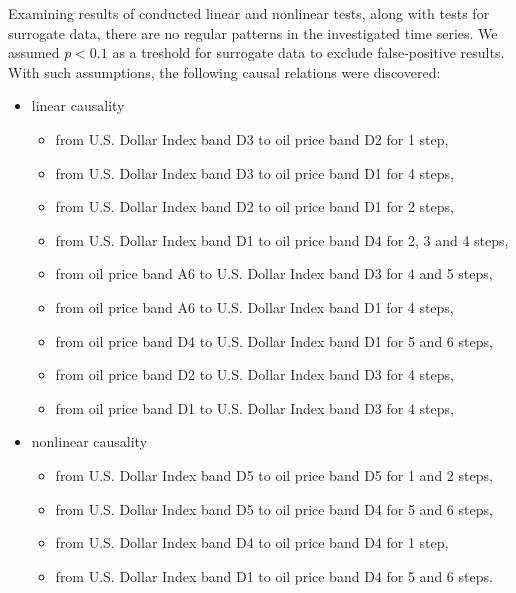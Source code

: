 Examining results of conducted linear and nonlinear tests, along with tests for surrogate data, there are no regular patterns in the investigated time series.
We assumed $p < 0.1$ as a treshold for surrogate data to exclude false-positive results.
With such assumptions, the following causal relations were discovered:
\begin{itemize}
    \item linear causality
    \begin{itemize}
        \item from U.S. Dollar Index band D3 to oil price band D2 for 1 step,
        \item from U.S. Dollar Index band D3 to oil price band D1 for 4 steps,
        \item from U.S. Dollar Index band D2 to oil price band D1 for 2 steps,
        \item from U.S. Dollar Index band D1 to oil price band D4 for 2, 3 and 4 steps,
        \item from oil price band A6 to U.S. Dollar Index band D3 for 4 and 5 steps,
        \item from oil price band A6 to U.S. Dollar Index band D1 for 4 steps,
        \item from oil price band D4 to U.S. Dollar Index band D1 for 5 and 6 steps,
        \item from oil price band D2 to U.S. Dollar Index band D3 for 4 steps,
        \item from oil price band D1 to U.S. Dollar Index band D3 for 4 steps,
    \end{itemize}
    \item nonlinear causality
    \begin{itemize}
        \item from U.S. Dollar Index band D5 to oil price band D5 for 1 and 2 steps,
        \item from U.S. Dollar Index band D5 to oil price band D4 for 5 and 6 steps,
        \item from U.S. Dollar Index band D4 to oil price band D4 for 1 step,
        \item from U.S. Dollar Index band D1 to oil price band D4 for 5 and 6 steps.
    \end{itemize}
\end{itemize}
